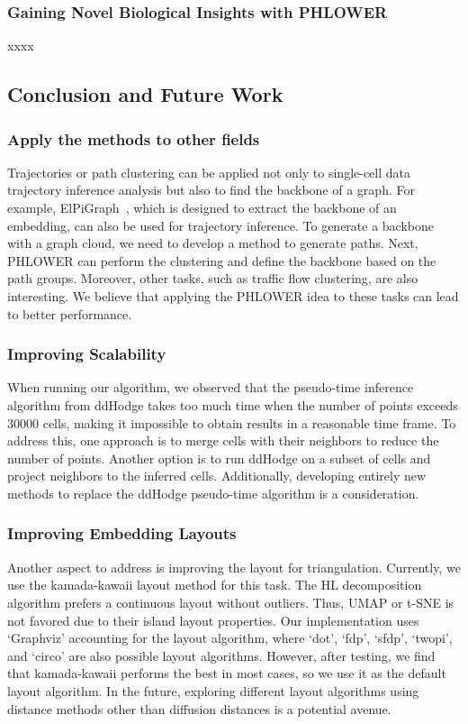 \subsubsection{Gaining Novel Biological Insights with PHLOWER}
xxxx
\subsection{Conclusion and Future Work}

\subsubsection{Apply the methods to other fields}
Trajectories or path clustering can be applied not only to single-cell data trajectory inference analysis but also to find the backbone of a graph. For example, ElPiGraph~\citep{albergante2020ElPiGraph}, which is designed to extract the backbone of an embedding, can also be used for trajectory inference. To generate a backbone with a graph cloud, we need to develop a method to generate paths. Next, PHLOWER can perform the clustering and define the backbone based on the path groups. Moreover, other tasks, such as traffic flow clustering\citep{kim2015spatial}, are also interesting. We believe that applying the PHLOWER idea to these tasks can lead to better performance.



\subsubsection{Improving Scalability}
When running our algorithm, we observed that the pseudo-time inference algorithm from ddHodge takes too much time when the number of points exceeds \num{30000} cells, making it impossible to obtain results in a reasonable time frame. To address this, one approach is to merge cells with their neighbors to reduce the number of points. Another option is to run ddHodge on a subset of cells and project neighbors to the inferred cells. Additionally, developing entirely new methods to replace the ddHodge pseudo-time algorithm is a consideration.

\subsubsection{Improving Embedding Layouts}
Another aspect to address is improving the layout for triangulation. Currently, we use the kamada-kawaii layout method for this task. The HL decomposition algorithm prefers a continuous layout without outliers. Thus, UMAP or t-SNE is not favored due to their island layout properties. Our implementation uses `Graphviz' accounting for the layout algorithm, where `dot', `fdp', `sfdp', `twopi', and `circo' are also possible layout algorithms. However, after testing, we find that kamada-kawaii performs the best in most cases, so we use it as the default layout algorithm. In the future, exploring different layout algorithms using distance methods other than diffusion distances is a potential avenue.

